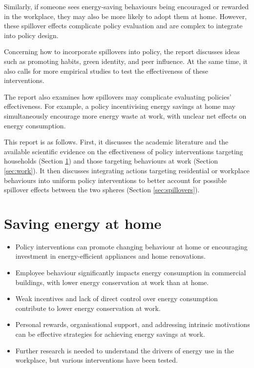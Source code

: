 \documentclass[
  12pt,
  captions=heading]{scrreport}
\begin{document}
Similarly, if someone sees energy-saving behaviours being encouraged or
rewarded in the workplace, they may also be more likely to adopt them at
home. However, these spillover effects complicate policy evaluation and
are complex to integrate into policy design.

Concerning how to incorporate spillovers into policy, the report
discusses ideas such as promoting habits, green identity, and peer
influence. At the same time, it also calls for more empirical studies to
test the effectiveness of these interventions.

The report also examines how spillovers may complicate evaluating
policies' effectiveness. For example, a policy incentivising energy
savings at home may simultaneously encourage more energy waste at work,
with unclear net effects on energy consumption.

This report is as follows. First, it discusses the academic literature
and the available scientific evidence on the effectiveness of policy
interventions targeting households (Section \ref{sec:home}) and those
targeting behaviours at work (Section \ref{sec:work}). It then discusses
integrating actions targeting residential or workplace behaviours into
uniform policy interventions to better account for possible spillover
effects between the two spheres (Section \ref{sec:spillovers}).

\hypertarget{sec:home}{%
\chapter{Saving energy at home}\label{sec:home}}

\begin{keypoints}
\begin{itemize}[leftmargin=*,labelsep=5mm]
    \item Policy interventions can promote changing behaviour at home or encouraging investment in energy-efficient appliances and home renovations.
    \item Employee behaviour significantly impacts energy consumption in commercial buildings, with lower energy conservation at work than at home.
    \item Weak incentives and lack of direct control over energy consumption contribute to lower energy conservation at work.
    \item Personal rewards, organisational support, and addressing intrinsic motivations can be effective strategies for achieving energy savings at work.
    \item Further research is needed to understand the drivers of energy use in the workplace, but various interventions have been tested.
\end{itemize}
\end{keypoints}
\end{document}
